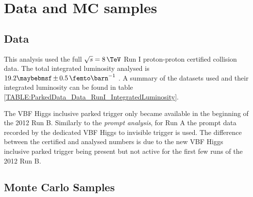 \section{Data and MC samples}





\subsection{Data}


This analysis used the full  $\sqrt{s}=8\,\TeV$ Run I proton-proton certified collision data. The total integrated luminosity analysed is $19.2 \pm 0.5 \,\femto\barn^{-1}$ \cite{ARTICLE:CMSLuminosityBasedonPixelClusterCounting}. A summary of the datasets used and their integrated luminosity can be found in table \ref{TABLE:ParkedData_Data_RunI_IntegratedLuminosity}.



The \gls{VBF} Higgs inclusive parked trigger only became available in the beginning of the 2012 Run B. Similarly to the \textit{prompt analysis}, for Run A the prompt data recorded by the dedicated \gls{VBF} Higgs to invisible trigger is used. The difference between the certified and analysed numbers is due to the new \gls{VBF} Higgs inclusive parked trigger being present but not active for the first few runs of the 2012 Run B.

\subsection{Monte Carlo Samples}

